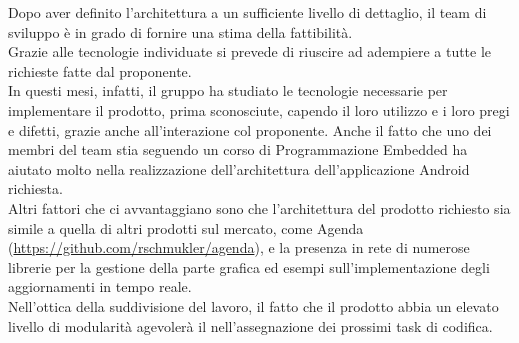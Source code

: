 Dopo aver definito l'architettura a un sufficiente livello di dettaglio, il team di sviluppo è in grado di fornire una stima della fattibilità.\\
Grazie alle tecnologie individuate si prevede di riuscire ad adempiere a tutte le richieste fatte dal proponente.\\
In questi mesi, infatti, il gruppo ha studiato le tecnologie necessarie per implementare il prodotto, prima sconosciute, capendo il loro utilizzo e i loro pregi e difetti, grazie anche all'interazione col proponente. Anche il fatto che uno dei membri del team stia seguendo un corso di Programmazione Embedded ha aiutato molto nella realizzazione dell'architettura dell'applicazione Android richiesta. \\
Altri fattori che ci avvantaggiano sono che l'architettura del prodotto richiesto sia simile a quella di altri prodotti sul mercato, come Agenda (\url{https://github.com/rschmukler/agenda}), e la presenza in rete di numerose librerie per la gestione della parte grafica ed esempi sull'implementazione degli aggiornamenti in tempo reale.\\
Nell'ottica della suddivisione del lavoro, il fatto che il prodotto abbia un elevato livello di modularità agevolerà il  nell'assegnazione dei prossimi task di codifica.\\